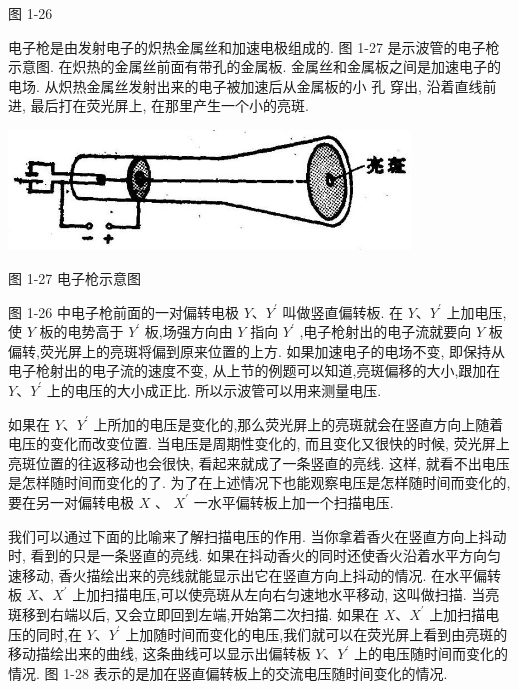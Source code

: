 \documentclass[10pt]{article}
\begin{document}
图 1-26

电子枪是由发射电子的炽热金属丝和加速电极组成的. 图 1-27 是示波管的电子枪示意图. 在炽热的金属丝前面有带孔的金属板. 金属丝和金属板之间是加速电子的电场. 从炽热金属丝发射出来的电子被加速后从金属板的小 孔 穿出, 沿着直线前进, 最后打在荧光屏上, 在那里产生一个小的亮斑.

\begin{center}
\includegraphics[max width=0.8\textwidth]{images/01913056-1f15-74d8-9184-9aab52c9d66b_41_377360.jpg}
\end{center}

图 1-27 电子枪示意图

图 1-26 中电子枪前面的一对偏转电极 \(Y\text{、}{Y}^{\prime }\) 叫做竖直偏转板. 在 \(Y\text{、}{Y}^{\prime }\) 上加电压,使 \(Y\) 板的电势高于 \({Y}^{\prime }\) 板,场强方向由 \(Y\) 指向 \({Y}^{\prime }\) ,电子枪射出的电子流就要向 \(Y\) 板偏转,荧光屏上的亮斑将偏到原来位置的上方. 如果加速电子的电场不变, 即保持从电子枪射出的电子流的速度不变, 从上节的例题可以知道,亮斑偏移的大小,跟加在 \(Y\text{、}{Y}^{\prime }\) 上的电压的大小成正比. 所以示波管可以用来测量电压.

如果在 \(Y\text{、}{Y}^{\prime }\) 上所加的电压是变化的,那么荧光屏上的亮斑就会在竖直方向上随着电压的变化而改变位置. 当电压是周期性变化的, 而且变化又很快的时候, 荧光屏上亮斑位置的往返移动也会很快, 看起来就成了一条竖直的亮线. 这样, 就看不出电压是怎样随时间而变化的了. 为了在上述情况下也能观察电压是怎样随时间而变化的,要在另一对偏转电极 \(X\) 、 \({X}^{\prime }\) 一水平偏转板上加一个扫描电压.

我们可以通过下面的比喻来了解扫描电压的作用. 当你拿着香火在竖直方向上抖动时, 看到的只是一条竖直的亮线. 如果在抖动香火的同时还使香火沿着水平方向匀速移动, 香火描绘出来的亮线就能显示出它在竖直方向上抖动的情况. 在水平偏转板 \(X\text{、}{X}^{\prime }\) 上加扫描电压,可以使亮斑从左向右匀速地水平移动, 这叫做扫描. 当亮斑移到右端以后, 又会立即回到左端,开始第二次扫描. 如果在 \(X\text{、}{X}^{\prime }\) 上加扫描电压的同时,在 \(Y\text{、}{Y}^{\prime }\) 上加随时间而变化的电压,我们就可以在荧光屏上看到由亮斑的移动描绘出来的曲线, 这条曲线可以显示出偏转板 \(Y\text{、}{Y}^{\prime }\) 上的电压随时间而变化的情况. 图 1-28 表示的是加在竖直偏转板上的交流电压随时间变化的情况.
\end{document}
